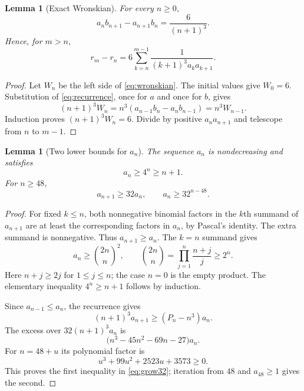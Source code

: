 \documentclass[11pt]{article}
\newtheorem{lemma}[theorem]{Lemma}
\theoremstyle{definition}\newtheorem{definition}[theorem]{Definition}
\theoremstyle{remark}\newtheorem{remark}[theorem]{Remark}
\begin{document}
\begin{lemma}[Exact Wronskian]\label{lem:wronskian}
For every $n\ge0$,
\begin{equation}\label{eq:wronskian}
 a_nb_{n+1}-a_{n+1}b_n=\frac6{(n+1)^3}.
\end{equation}
Hence, for $m>n$,
\begin{equation}\label{eq:r-tail}
 r_m-r_n=6\sum_{k=n}^{m-1}\frac1{(k+1)^3a_ka_{k+1}}.
\end{equation}
\end{lemma}
\begin{proof}
Let $W_n$ be the left side of \eqref{eq:wronskian}. The initial values give
$W_0=6$. Substitution of \eqref{eq:recurrence}, once for $a$ and once for
$b$, gives
\[
 (n+1)^3W_n=n^3(a_{n-1}b_n-a_nb_{n-1})=n^3W_{n-1}.
\]
Induction proves $(n+1)^3W_n=6$. Divide by positive $a_na_{n+1}$ and
telescope from $n$ to $m-1$.
\end{proof}

\begin{lemma}[Two lower bounds for $a_n$]\label{lem:growth}
The sequence $a_n$ is nondecreasing and satisfies
\begin{equation}\label{eq:grow4}
 a_n\ge4^n\ge n+1.
\end{equation}
For $n\ge48$,
\begin{equation}\label{eq:grow32}
 a_{n+1}\ge32a_n,\qquad a_n\ge32^{n-48}.
\end{equation}
\end{lemma}
\begin{proof}
For fixed $k\le n$, both nonnegative binomial factors in the $k$th summand
of $a_{n+1}$ are at least the corresponding factors in $a_n$, by Pascal's
identity. The extra summand is nonnegative. Thus $a_{n+1}\ge a_n$.
The $k=n$ summand gives
\[
 a_n\ge\binom{2n}{n}^2,
 \qquad\binom{2n}{n}=\prod_{j=1}^{n}\frac{n+j}{j}\ge2^n.
\]
Here $n+j\ge2j$ for $1\le j\le n$; the case $n=0$ is the empty product.
The elementary inequality $4^n\ge n+1$ follows by induction.

Since $a_{n-1}\le a_n$, the recurrence gives
\[
 (n+1)^3a_{n+1}\ge(P_n-n^3)a_n.
\]
The excess over $32(n+1)^3a_n$ is
\[
 \bigl(n^3-45n^2-69n-27\bigr)a_n.
\]
For $n=48+u$ its polynomial factor is
\begin{equation}\label{eq:growth-poly}
 u^3+99u^2+2523u+3573\ge0.
\end{equation}
This proves the first inequality in \eqref{eq:grow32}; iteration from $48$
and $a_{48}\ge1$ gives the second.
\end{proof}
\end{document}
